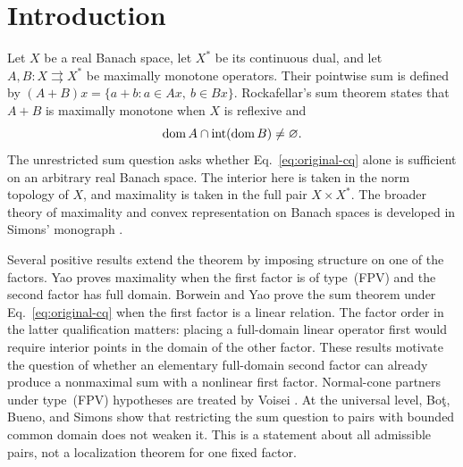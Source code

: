 \section{Introduction}
\label{sec:introduction}
Let $X$ be a real Banach space, let $X^*$ be its continuous dual, and let
$A,B:X\rightrightarrows X^*$ be maximally monotone operators. Their pointwise
sum is defined by $(A+B)x=\{a+b:a\in Ax,\ b\in Bx\}$. Rockafellar's sum
theorem \cite{rockafellar1970} states that $A+B$ is maximally monotone when
$X$ is reflexive and
\begin{equation}
\operatorname{dom} A\cap\operatorname{int}(\operatorname{dom} B)\ne\varnothing.
\label{eq:original-cq}
\end{equation}
The unrestricted sum question asks whether Eq.~\eqref{eq:original-cq}
alone is sufficient on an arbitrary real Banach space. The interior here
is taken in the norm topology of $X$, and maximality is taken in the full
pair $X\times X^*$.
The broader theory of maximality and convex representation on Banach
spaces is developed in Simons' monograph \cite{simons2008}.

Several positive results extend the theorem by imposing structure on one
of the factors. Yao \cite{yao2010} proves maximality when the first factor
is of type~(FPV) and the second factor has full domain. Borwein and Yao
\cite{borweinyao2012} prove the sum theorem under
Eq.~\eqref{eq:original-cq} when the first factor is a linear relation.
The factor order in the latter qualification matters: placing a
full-domain linear operator first would require interior points in the
domain of the other factor. These results motivate the question of
whether an elementary full-domain second factor can already produce a
nonmaximal sum with a nonlinear first factor.
Normal-cone partners under type~(FPV) hypotheses are treated by Voisei
\cite{voisei2010}. At the universal level, Bo\c{t}, Bueno, and Simons
\cite{botbuenosimons2016} show that restricting the sum question to pairs
with bounded common domain does not weaken it. This is a statement about
all admissible pairs, not a localization theorem for one fixed factor.

